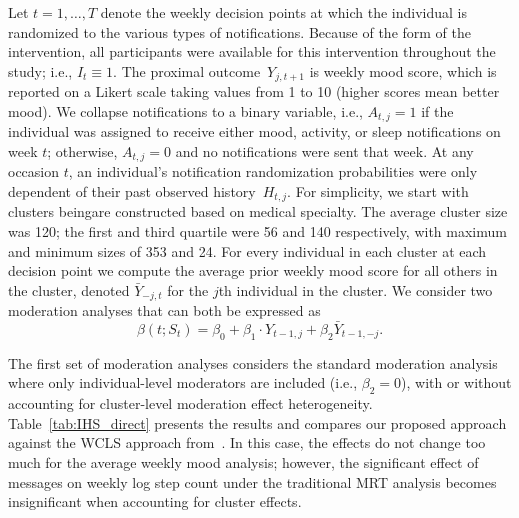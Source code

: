\documentclass[12pt]{article}
\newcommand{\zw}[1]{\textcolor{blue}{[\textit{ZW: #1}]}}
\begin{document}
Let $t=1,\ldots,T$ denote the weekly decision points at which the individual is randomized to the various types of notifications.  Because of the form of the intervention, all participants were available for this intervention throughout the study; i.e., $I_t \equiv 1$. The proximal outcome~$Y_{j,t+1}$ is weekly mood score, which is reported on a Likert scale  taking values from 1 to 10 (higher scores mean better mood). We collapse notifications to a binary variable, i.e., $A_{t,j}=1$ if the individual was assigned to receive either mood, activity, or sleep notifications on week $t$; otherwise, $A_{t,j}= 0$ and no notifications were sent that week. At any occasion $t$, an individual's notification randomization probabilities were only dependent of their past observed history~$H_{t,j}$. For simplicity, we start with clusters beingare constructed based on medical specialty.  The average cluster size was 120; the first and third quartile were 56 and 140 respectively, with maximum and minimum sizes of 353 and 24.  For every individual in each cluster at each decision point we compute the average prior weekly mood score for all others in the cluster, denoted $\bar Y_{-j, t}$ for the $j$th individual in the cluster.  We consider two moderation analyses that can both be expressed as
$$
\beta(t; S_t) = \beta_0 + \beta_1 \cdot Y_{t-1,j} + \beta_2 \bar Y_{t-1,-j}.
$$

The first set of moderation analyses considers the standard moderation analysis where only individual-level moderators are included (i.e., $\beta_2 = 0$), with or without accounting for cluster-level moderation effect heterogeneity. Table~\ref{tab:IHS_direct} presents the results and compares our proposed approach against the WCLS approach from~\cite{Boruvkaetal}.  In this case, the effects do not change too much for the average weekly mood analysis; however, the significant effect of messages on weekly log step count under the traditional MRT analysis becomes insignificant when accounting for cluster effects.
\end{document}
